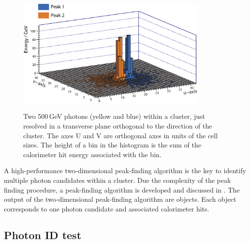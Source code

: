 
\begin{figure}[tbph]
\centering
{\includegraphics[width=0.85\textwidth]{photon/peakFindingMod}}
\caption[Example of projecting a large photon cluster containing two photons.]
{Two 500\,GeV photons (yellow and blue) within a  cluster, just resolved in a transverse plane orthogonal to the direction of the cluster.  The axes U and V are orthogonal axes in units of the \ECAL cell sizes. The height of a bin in the histogram is the sum of the calorimeter hit energy associated with the bin.}
\label{fig:photonPeakFinding}
\end{figure}


A high-performance two-dimensional peak-finding algorithm is the key to identify multiple photon candidates within a cluster. Due the complexity of the peak finding procedure, a peak-finding algorithm is developed and discussed in . The output of the two-dimensional peak-finding algorithm are \ShowerPeak objects. Each \ShowerPeak object corresponds to one photon candidate and associated calorimeter hits.

\subsection{Photon ID test}
\label{sec:photonIDtest}

